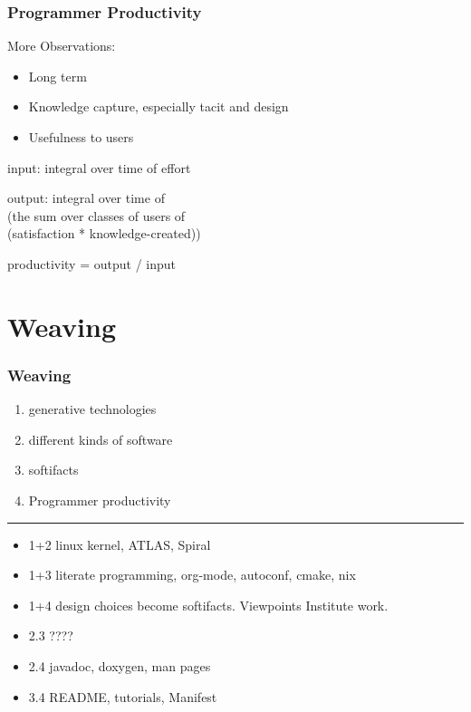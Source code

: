 \documentclass{beamer}
\begin{document}

\begin{frame}

\frametitle{Programmer Productivity}

More Observations:
\begin{itemize}
\item<1-> Long term
\item<2-> Knowledge capture, especially tacit and design
\item<3-> Usefulness to users
\end{itemize}
\vspace*{1cm}

input: integral over time of effort
\vspace*{7mm}

output: integral over time of \\
  \hspace*{2mm}(the sum over classes of users of \\
  \hspace*{3mm}(satisfaction * knowledge-created))
\vspace*{7mm}

productivity = output / input
\end{frame}


\section[Weaving]{Weaving}


\begin{frame}

\frametitle{Weaving}

\begin{enumerate}
  \item generative technologies
  \item different kinds of software
  \item softifacts
  \item Programmer productivity
\end{enumerate}
\vspace*{4mm}
\noindent\rule{\textwidth}{0.3pt}
\vspace*{2mm}
\begin{itemize}
\item 1+2 linux kernel, ATLAS, Spiral
\item 1+3 literate programming, org-mode, autoconf, cmake, nix
\item 1+4 design choices become softifacts. Viewpoints Institute work.
\item 2.3 ????
\item 2.4 javadoc, doxygen, man pages
\item 3.4 README, tutorials, Manifest
\end{itemize}

\end{frame}
\end{document}
